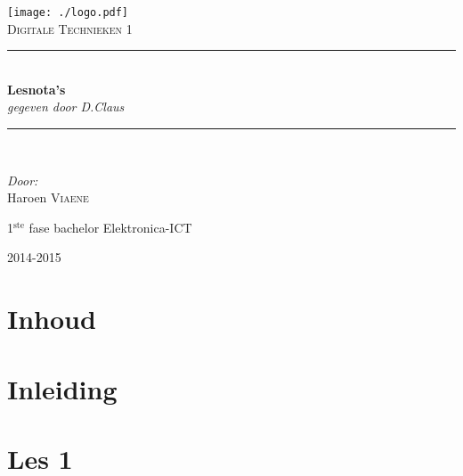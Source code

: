 \documentclass[11pt, a4paper]{article}
\newcommand{\HRule}{\rule{\linewidth}{0.5mm}}
\begin{document}
\begin{titlepage}
\begin{center}
\texttt{[image: ./logo.pdf]}~\\[1cm]


\textsc{\Large Digitale Technieken 1}\\[0.5cm]

\HRule \\[0.4cm]
{ \LARGE \bfseries Lesnota's}\\[0.4cm]
{\large \textit{gegeven door D.Claus}}\\[0.2cm]

\HRule \\[1.5cm]

\begin{minipage}{0.4\textwidth}
\begin{flushleft} \large
\emph{Door:}\\
Haroen \textsc{Viaene}\\

\end{flushleft}
\end{minipage}
\begin{minipage}{0.4\textwidth}
\begin{flushright} \large
\large{1$^{\text{ste}}$ fase bachelor Elektronica-ICT}\\
\end{flushright}
\end{minipage}

\vfill

{\large 2014-2015}

\end{center}
\end{titlepage}

\newpage

\section*{Inhoud}

\tableofcontents

\newpage

\section{Inleiding}

\section{Les 1}
\end{document}
